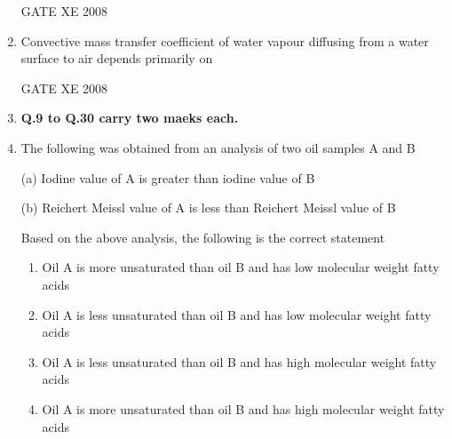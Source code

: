 \documentclass[12pt]{article}
\begin{document}
\begin{enumerate}[label=Q\arabic*.]
\begin{enumerate}[label=(\Alph*)]
\end{enumerate}
    
    GATE XE 2008

    \item Convective mass transfer coefficient of water vapour diffusing from a water surface to air depends primarily on 

\begin{enumerate}[label=(\Alph*)]
\end{enumerate}
    
    GATE XE 2008

\item[] \textbf{Q.9 to Q.30 carry two maeks each.}    

\item The following was obtained from an analysis of two oil samples A and B  

(a) Iodine value of A is greater than iodine value of B  

(b) Reichert Meissl value of A is less than Reichert Meissl value of B  

Based on the above analysis, the following is the correct statement  

\begin{enumerate}[label=(\Alph*)]
\item  Oil A is more unsaturated than oil B and has low molecular weight fatty acids
\item  Oil A is less unsaturated than oil B and has low molecular weight fatty acids 
\item  Oil A is less unsaturated than oil B and has high molecular weight fatty acids
\item Oil A is more unsaturated than oil B and has high molecular weight fatty acids  
\end{enumerate}


\end{enumerate}
\end{document}
